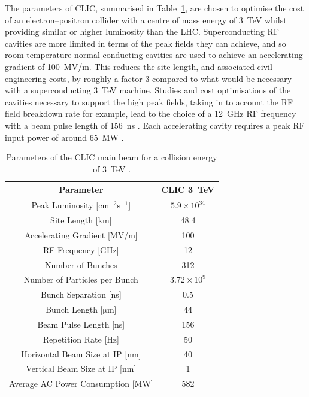 The parameters of CLIC, summarised in Table~\ref{t:clicParams}, are chosen to optimise the cost of an electron--positron collider with a centre of mass energy of 3~TeV whilst providing similar or higher luminosity than the LHC. Superconducting RF cavities are more limited in terms of the peak fields they can achieve, and so room temperature normal conducting cavities are used to achieve an accelerating gradient of 100~MV/m. This reduces the site length, and associated civil engineering costs, by roughly a factor 3 compared to what would be necessary with a superconducting 3~TeV machine. Studies and cost optimisations of the cavities necessary to support the high peak fields, taking in to account the RF field breakdown rate for example, lead to the choice of a 12~GHz RF frequency with a beam pulse length of 156~ns \cite{clicCDR}. Each accelerating cavity requires a peak RF input power of around 65~MW \cite{clicCDR}.
\linebreak
\begin{table}
  \begin{center}
  	\begin{tabular}{| c c |}
	   \hline
       Parameter & CLIC 3~TeV\\
       \hline
       Peak Luminosity [\(\mathrm{cm^{-2}s^{-1}}\)] & \(5.9\times10^{34}\) \\
       Site Length [km] & 48.4 \\
       Accelerating Gradient [MV/m] & 100 \\
	   RF Frequency [GHz] & 12 \\
	   Number of Bunches & 312 \\
	   Number of Particles per Bunch & \(3.72\times10^9\) \\
	   Bunch Separation [ns] & 0.5 \\
	   Bunch Length [\(\mathrm{\mu m}\)] & 44 \\
	   Beam Pulse Length [ns]  & 156 \\
	   Repetition Rate [Hz] & 50 \\
	   Horizontal Beam Size at IP [nm] & 40 \\
	   Vertical Beam Size at IP [nm] & 1 \\
	   Average AC Power Consumption [MW] & 582 \\
	   \hline
    \end{tabular}
    \caption{Parameters of the CLIC main beam for a collision energy of 3~TeV \cite{clicCDR}.}
  	\label{t:clicParams}
  \end{center}
\end{table}

